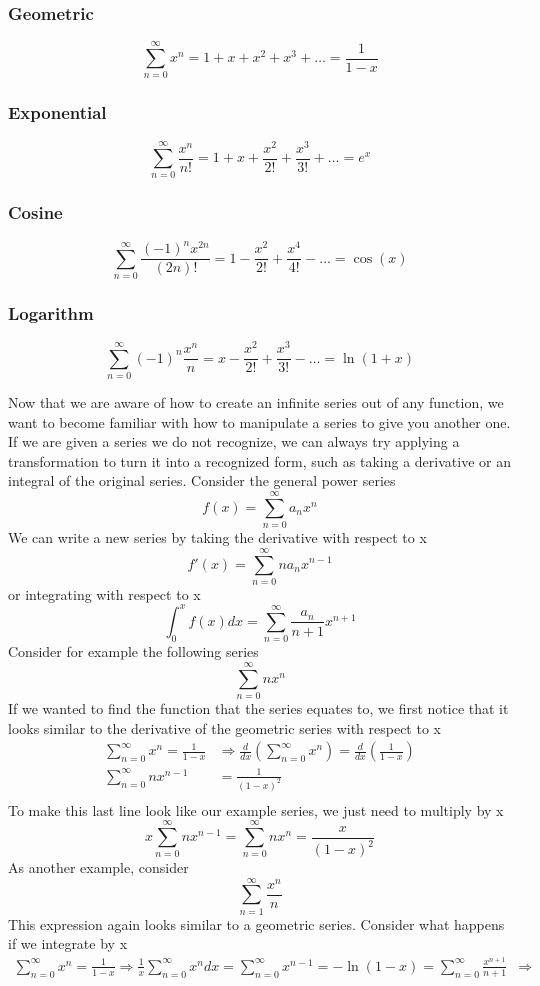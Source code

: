 \documentclass{article}
\newcommand{\be}{\begin{equation}}
\newcommand{\ee}{\end{equation}}
\newcommand{\sumzero}{\sum_{n=0}^\infty}
\newcommand{\sumone}{\sum_{n=1}^\infty}
\begin{document}
\subsubsection*{Geometric}
\be
\sumzero x^n = 1 + x + x^2 + x^3 + \hdots = \frac{1}{1-x}
\ee

\subsubsection*{Exponential}
\be
\sumzero \frac{x^n}{n!} = 1 + x + \frac{x^2}{2!} + \frac{x^3}{3!} + \hdots = e^x
\ee

\subsubsection*{Cosine}
\be
\sumzero \frac{(-1)^n x^{2n}}{(2n)!} = 1 - \frac{x^2}{2!} + \frac{x^4}{4!} - \hdots = \cos(x)
\ee

\subsubsection*{Logarithm}
\be
\sumzero (-1)^{n} \frac{x^n}{n} = x - \frac{x^2}{2!} + \frac{x^3}{3!} - \hdots = \ln(1+x)
\ee

Now that we are aware of how to create an infinite series out of any function, we want to become familiar with how to manipulate a series to give you another one.
If we are given a series we do not recognize, we can always try applying a transformation to turn it into a recognized form, such as taking a derivative or an integral of the original series.
Consider the general power series
\be
f(x) = \sumzero a_nx^n
\ee
We can write a new series by taking the derivative with respect to x
\be
f'(x) = \sumzero na_nx^{n-1}
\ee
or integrating with respect to x
\be
\int_{0}^{x} f(x) dx = \sumzero \frac{a_n}{n+1}x^{n+1}
\ee
Consider for example the following series
\be
\sumzero nx^n
\ee
If we wanted to find the function that the series equates to, we first notice that it looks similar to the derivative of the geometric series with respect to x
\be
\begin{split}
	\sumzero x^n = \frac{1}{1-x} &\Rightarrow \frac{d}{dx} \left( \sumzero x^n\right) = \frac{d}{dx} \left( \frac{1}{1-x} \right)\\
	\sumzero nx^{n-1} &= \frac{1}{(1-x)^2} \\
\end{split}
\ee
To make this last line look like our example series, we just need to multiply by x
\be
x \sumzero nx^{n-1} = \sumzero nx^{n} = \frac{x}{(1-x)^2}
\ee
As another example, consider
\be
\sumone \frac{x^n}{n}
\ee
This expression again looks similar to a geometric series.
Consider what happens if we integrate by x
\be
\begin{split}
\sumzero x^n = \frac{1}{1-x} \Rightarrow \frac{1}{x} \sumzero x^n dx = \sumzero x^{n-1} = - \ln(1 - x) = \sumzero \frac{x^{n+1}}{n+1} &\Rightarrow \\
\end{split}
\ee
\end{document}
